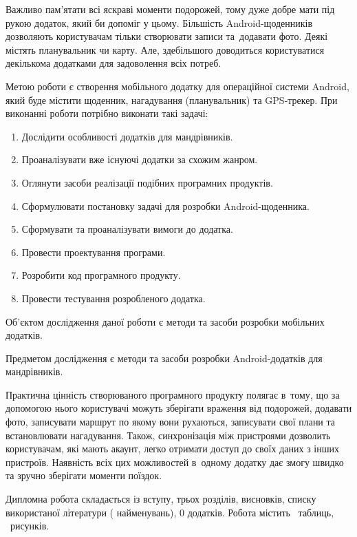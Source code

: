 \documentclass[../main.tex]{subfiles}
\begin{document}
Важливо пам'ятати всі яскраві моменти подорожей, тому дуже добре мати під рукою додаток, який би допоміг у цьому. Більшість Android-щоденників дозволяють користувачам тільки створювати записи та~додавати фото. Деякі містять планувальник чи карту. Але, здебільшого доводиться користуватися декількома додатками для задоволення всіх потреб.

Метою роботи є створення мобільного додатку для операційної системи Android, який буде містити щоденник, нагадування (планувальник) та \mbox{GPS-трекер}.
При виконанні роботи потрібно виконати такі задачі:
\begin{enumerate}
\item Дослідити особливості додатків для мандрівників.
\item Проаналізувати вже існуючі додатки за схожим жанром.
\item Оглянути засоби реалізації подібних програмних продуктів.
\item Сформулювати постановку задачі для розробки Android-щоденника.
\item Сформувати та проаналізувати вимоги до додатка.
\item Провести проектування програми.
\item Розробити код програмного продукту.
\item Провести тестування розробленого додатка.
\end{enumerate}

Об'єктом дослідження даної роботи є методи та засоби розробки мобільних додатків. 

Предметом дослідження є методи та засоби розробки Android-додатків для мандрівників.

Практична цінність створюваного програмного продукту полягає в~тому, що за допомогою нього користувачі можуть зберігати враження від подорожей, додавати фото, записувати маршрут по якому вони рухаються, записувати свої плани та встановлювати нагадування. Також, синхронізація між пристроями дозволить користувачам, які мають акаунт, легко отримати доступ до своїх даних з інших пристроїв. Наявність всіх цих можливостей в~одному додатку дає змогу швидко та зручно зберігати моменти поїздок.

Дипломна робота складається із вступу, трьох розділів, висновків, списку використаної літератури ( найменувань), 0 додатків. Робота містить \totaltables\ таблиць, \totalfigures\ рисунків. 
\end{document}
